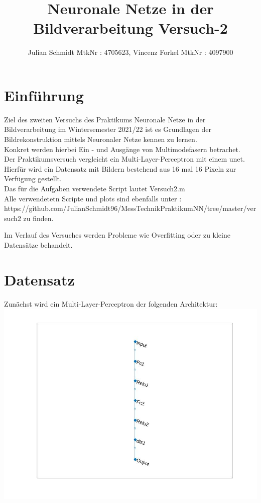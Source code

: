 \documentclass[8pt,a4paper]{article}
\title{Neuronale Netze in der Bildverarbeitung Versuch-2}
\author{Julian Schmidt MtkNr : 4705623, Vincenz Forkel MtkNr : 4097900}
\begin{document}
\maketitle

\section{Einführung}

Ziel des zweiten Versuchs des Praktikums Neuronale Netze in der Bildverarbeitung im Wintersemester 2021/22 ist es Grundlagen der Bildrekonstruktion mittels Neuronaler Netze kennen zu lernen.\\
Konkret werden hierbei Ein - und Ausgänge von Multimodefasern betrachet.\\
Der Praktikumsversuch vergleicht ein Multi-Layer-Perceptron mit einem unet.\\



Hierfür wird ein Datensatz mit Bildern bestehend aus 16 mal 16 Pixeln zur Verfügung gestellt.\\

Das für die Aufgaben verwendete Script lautet Versuch2.m\\
Alle verwendetetn Scripte und plots sind ebenfalls unter : https://github.com/JulianSchmidt96/MessTechnikPraktikumNN/tree/master/versuch2 zu finden.



Im Verlauf des Versuches werden Probleme wie Overfitting oder zu kleine Datensätze behandelt.
\newpage

\section{Datensatz}

Zunächst wird ein Multi-Layer-Perceptron der folgenden Architektur:\\

\includegraphics[scale=0.2]{layers.jpg}
\end{document}
